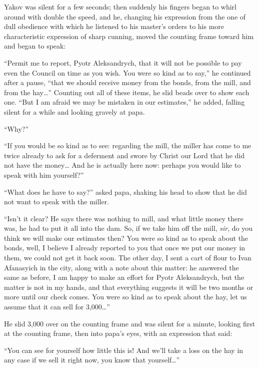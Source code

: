 Yakov was silent for a few seconds; then suddenly his fingers began to whirl around with double the speed, and he, changing his expression from the one of dull obedience with which he listened to his master's orders to his more characteristic expression of sharp cunning, moved the counting frame toward him and began to speak:

``Permit me to report, Pyotr Aleksandrych, that it will not be possible to pay even the Council on time as you wish. You were so kind as to say,'' he continued after a pause, ``that we should receive money from the bonds, from the mill, and from the hay\ldots{}'' Counting out all of these items, he slid beads over to show each one. ``But I am afraid we may be mistaken in our estimates,'' he added, falling silent for a while and looking gravely at papa. %

``Why?'' %

``If you would be so kind as to see: regarding the mill, the miller has come to me twice already to ask for a deferment and swore by Christ our Lord that he did not have the money\ldots{} And he is actually here now: perhaps you would like to speak with him yourself?'' %

``What does he have to say?'' asked papa, shaking his head to show that he did not want to speak with the miller. %

``Isn't it clear? He says there was nothing to mill, and what little money there was, he had to put it all into the dam. So, if we take him off the mill, \emph{sir}, do you think we will make our estimates then? You were so kind as to speak about the bonds, well, I believe I already reported to you that once we put our money in them, we could not get it back soon. The other day, I sent a cart of flour to Ivan Afanasyich in the city, along with a note about this matter: he answered the same as before, I am happy to make an effort for Pyotr Aleksandrych, but the matter is not in my hands, and that everything suggests it will be two months or more until our check comes. You were so kind as to speak about the hay, let us assume that it can sell for 3,000\ldots{}'' %

He slid 3,000 over on the counting frame and was silent for a minute, looking first at the counting frame, then into papa's eyes, with an expression that said:

``You can see for yourself how little this is! And we'll take a loss on the hay in any case if we sell it right now, you know that yourself\ldots{}'' %

